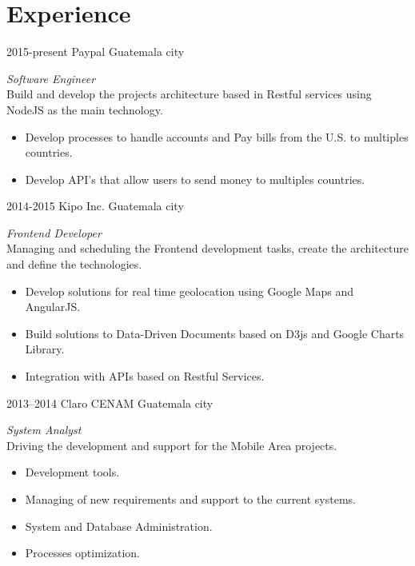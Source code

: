\documentclass[]{friggeri-cv} %
\begin{document}
\section{Experience}
\begin{entrylist}
\entry
	{2015-present}
	{Paypal}
	{Guatemala city}
	{\emph{Software Engineer} \\
	Build and develop the projects architecture based in Restful services using NodeJS as the main technology.
	\begin{itemize}
		\item Develop processes to handle accounts and Pay bills from the U.S. to multiples countries.
		\item Develop API's that allow users to send money to multiples countries.
	\end{itemize}
	}

\entry
	{2014-2015}
	{Kipo Inc.}
	{Guatemala city}
	{\emph{Frontend Developer} \\
	Managing and scheduling the Frontend development tasks, create the architecture and define the technologies.
	\begin{itemize}
		\item Develop solutions for real time geolocation using Google Maps and AngularJS.
		\item Build solutions to Data-Driven Documents based on D3js and Google Charts Library.
		\item Integration with APIs based on Restful Services.
	\end{itemize}
	
	}
	
\entry
	{2013--2014}
	{Claro CENAM}
	{Guatemala city}
	{\emph{System Analyst} \\
	Driving the development and support for the Mobile Area projects.
	\begin{itemize}
		\item Development tools.
		\item Managing of new requirements and support to the current systems.
		\item System and Database Administration.
		\item Processes optimization.
		
	\end{itemize}
	
	}

\end{entrylist}

\end{document}
